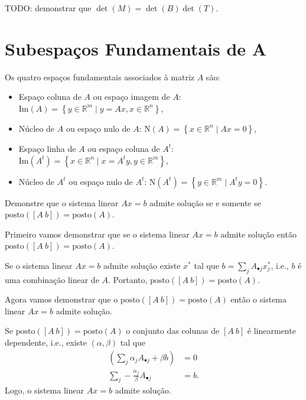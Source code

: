 \documentclass[a4paper,12pt, leqno, answers]{exam}
\newcommand{\mdot}{\bullet}
\newcommand{\EI}{\text{Im}}
\newcommand{\EN}{\text{N}}
\newcommand{\posto}{\text{posto}}
\begin{document}
\begin{questions}
\begin{parts}
\begin{solution}
            TODO: demonstrar que $\det (M) = \det (B) \det (T)$.
        \end{solution}
    \end{parts}

    \section*{Subespa\c{c}os Fundamentais de A}
    Os quatro espa\c{c}os fundamentais associados \`{a} matriz $A$ s\~{a}o:
    \begin{itemize}
        \item Espa\c{c}o coluna de $A$ ou espa\c{c}o imagem de $A$: $\EI (A) = \left\{ y \in \mathbb{R}^m \mid y = A x, x \in \mathbb{R}^n \right\}$,
        \item N\'{u}cleo de $A$ ou espa\c{c}o nulo de $A$: $\EN (A) = \left\{ x \in \mathbb{R}^n \mid A x = 0 \right\}$,
        \item Espa\c{c}o linha de $A$ ou espa\c{c}o coluna de $A^t$: $\EI (A^t) = \left\{ x \in \mathbb{R}^n \mid x = A^t y , y \in \mathbb{R}^m \right\}$,
        \item N\'{u}cleo de $A^t$ ou espa\c{c}o nulo de $A^t$: $\EN (A^t) = \left\{ y \in \mathbb{R}^m \mid A^t y = 0 \right\}$.
    \end{itemize}

    \question Demonstre que o sistema linear $A x = b$ admite solu\c{c}\~{a}o se e somente se $\posto ([A \ b]) = \posto (A)$.
    \begin{solution}
        Primeiro vamos demonstrar que se o sistema linear $A x = b$ admite solu\c{c}\~{a}o ent\~{a}o $\posto ([A \ b]) = \posto (A)$.

        Se o sistema linear $A x = b$ admite solu\c{c}\~{a}o existe $x^*$ tal que $b = \sum_j A_{\mdot j} x^*_j$, i.e., $b$ \'{e} uma combina\c{c}\~{a}o linear de $A$. Portanto, $\posto ([A \ b]) = \posto (A)$.

        Agora vamos demonstrar que o $\posto ([A \ b]) = \posto (A)$ ent\~{a}o o sistema linear $A x = b$ admite solu\c{c}\~{a}o.

        Se $\posto ([A \ b]) = \posto (A)$ o conjunto das colunas de $[A \ b]$ \'{e} linearmente dependente, i.e., existe $(\alpha, \beta)$ tal que
        \begin{align*}
            \left( \sum_j \alpha_j A_{\mdot j} + \beta b \right) &= 0 \\
            \sum_j - \frac{\alpha_j}{\beta} A_{\mdot j} &= b.
        \end{align*}
        Logo, o sistema linear $A x = b$ admite solu\c{c}\~{a}o.
    \end{solution}


\end{questions}
\end{document}
